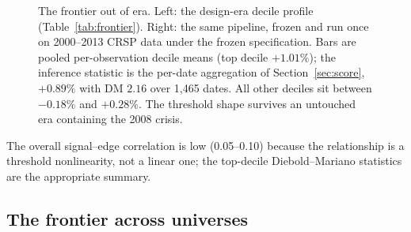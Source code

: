 \documentclass[11pt]{article}
\theoremstyle{remark}
\begin{document}
\begin{figure}[t]
\centering
{}\hfill
{}
\caption{The frontier out of era. Left: the design-era decile profile
(Table~\ref{tab:frontier}). Right: the same pipeline, frozen and run
once on 2000--2013 CRSP data under the frozen specification. Bars are
pooled per-observation decile means (top decile $+1.01\%$); the
inference statistic is the per-date aggregation of
Section~\ref{sec:score}, $+0.89\%$ with DM $2.16$ over 1{,}465 dates.
All other deciles sit between $-0.18\%$ and $+0.28\%$. The threshold
shape survives an untouched era containing the 2008 crisis.}
\label{fig:holdout}
\end{figure} The overall
signal--edge correlation is low (0.05--0.10) because the relationship
is a threshold nonlinearity, not a linear one; the top-decile
Diebold--Mariano statistics are the appropriate summary.

\subsection{The frontier across universes}
\end{document}
